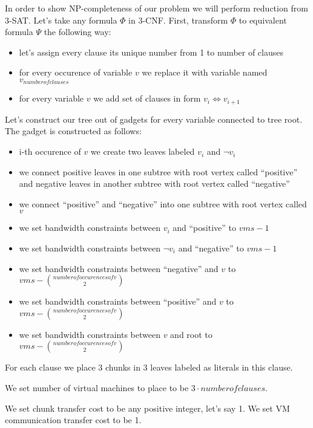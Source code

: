 In order to show NP-completeness of our problem we will perform
reduction from 3-SAT. Let's take any formula $\Phi$ in 3-CNF. First,
transform $\Phi$ to equivalent formula $\Psi$ the following way:

\begin{itemize}
\item let's assign every clause its unique number from 1 to number of
  clauses
\item for every occurence of variable $v$ we replace it with variable named $v_{number
    of clauses}$
\item for every variable $v$ we add set of clauses in form $v_i \iff v_{i+1}$
\end{itemize}

Let's construct our tree out of gadgets for every variable connected
to tree root. The gadget is constructed as follows:

\begin{itemize}
\item i-th occurence of $v$ we create two leaves labeled $v_i$ and
  $\neg v_i$
\item we connect positive leaves in one subtree with root vertex called ``positive'' and negative leaves in
  another subtree with root vertex called ``negative''
\item we connect ``positive'' and ``negative'' into one subtree with
  root vertex called $v$
\item we set bandwidth constraints between $v_i$ and ``positive'' to
  $vms - 1$
\item we set bandwidth constraints between $\neg v_i$ and ``negative''
  to $vms - 1$
\item we set bandwidth constraints between ``negative'' and $v$ to
  $vms - \binom{number of occurences of v}{2}$
\item we set bandwidth constraints between ``positive'' and $v$ to
  $vms - \binom{number of occurences of v}{2}$
\item we set bandwidth constraints between $v$ and root to
  $vms - \binom{number of occurences of v}{2}$
\end{itemize}

For each clause we place 3 chunks in 3 leaves labeled as literals in
this clause.

We set number of virtual machines to place to be $3 \cdot number of
clauses$.

We set chunk transfer cost to be any positive integer, let's say 1.
We set VM communication transfer cost to be 1.

